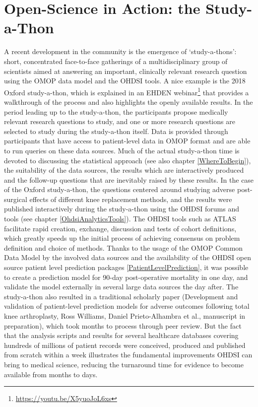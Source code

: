 \documentclass[11pt]{book}
\let\rmarkdownfootnote\footnote%
\def\footnote{\protect\rmarkdownfootnote}
\theoremstyle{definition}
\theoremstyle{definition}
\theoremstyle{definition}
\theoremstyle{remark}
\begin{document}
\section{Open-Science in Action: the
Study-a-Thon}\label{open-science-in-action-the-study-a-thon}


A recent development in the community is the emergence of
`study-a-thons': short, concentrated face-to-face gatherings of a
multidisciplinary group of scientists aimed at answering an important,
clinically relevant research question using the OMOP data model and the
OHDSI tools. A nice example is the 2018 Oxford study-a-thon, which is
explained in an EHDEN webinar\footnote{\url{https://youtu.be/X5yuoJoL6xs}}
that provides a walkthrough of the process and also highlights the
openly available results. In the period leading up to the study-a-thon,
the participants propose medically relevant research questions to study,
and one or more research questions are selected to study during the
study-a-thon itself. Data is provided through participants that have
access to patient-level data in OMOP format and are able to run queries
on these data sources. Much of the actual study-a-thon time is devoted
to discussing the statistical approach (see also chapter
\ref{WhereToBegin}), the suitability of the data sources, the results
which are interactively produced and the follow-up questions that are
inevitably raised by these results. In the case of the Oxford
study-a-thon, the questions centered around studying adverse
post-surgical effects of different knee replacement methods, and the
results were published interactively during the study-a-thon using the
OHDSI forums and tools (see chapter \ref{OhdsiAnalyticsTools}). The
OHDSI tools such as ATLAS facilitate rapid creation, exchange,
discussion and tests of cohort definitions, which greatly speeds up the
initial process of achieving consensus on problem definition and choice
of methods. Thanks to the usage of the OMOP Common Data Model by the
involved data sources and the availability of the OHDSI open source
patient level prediction packages \ref{PatientLevelPrediction}, it was
possible to create a prediction model for 90-day post-operative
mortality in one day, and validate the model externally in several large
data sources the day after. The study-a-thon also resulted in a
traditional scholarly paper (Development and validation of patient-level
prediction models for adverse outcomes following total knee
arthroplasty, Ross Williams, Daniel Prieto-Alhambra et al., manuscript
in preparation), which took months to process through peer review. But
the fact that the analysis scripts and results for several healthcare
databases covering hundreds of millions of patient records were
conceived, produced and published from scratch within a week illustrates
the fundamental improvements OHDSI can bring to medical science,
reducing the turnaround time for evidence to become available from
months to days.
\end{document}
